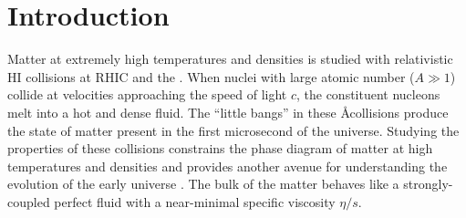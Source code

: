 \chapter{Introduction}
\label{ch:intro}


 

Matter at extremely high temperatures and densities is studied with relativistic \ac{HI} collisions at \ac{RHIC} and the \lhc.
When nuclei with large atomic number ($A \gg 1$) collide at velocities approaching the speed of light $c$, the constituent nucleons melt into a hot and dense fluid.
The ``little bangs'' in these \AA collisions produce the state of matter present in the first microsecond of the universe.
Studying the properties of these collisions constrains the phase diagram of matter at high temperatures and densities and provides another avenue for understanding the evolution of the early universe \cite{Busza:2018rrf}.
The bulk of the matter behaves like a strongly-coupled perfect fluid with a near-minimal specific viscosity $\eta/s$.

